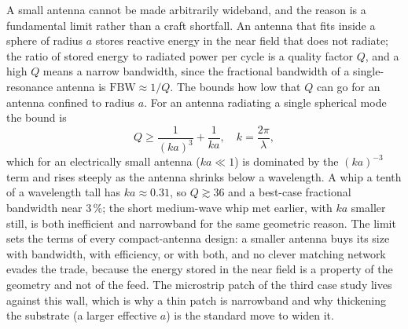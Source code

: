 \begin{mastery}
A small antenna cannot be made arbitrarily wideband, and the reason is a
fundamental limit rather than a craft shortfall. An antenna that fits
inside a sphere of radius $a$ stores reactive energy in the near field
that does not radiate; the ratio of stored energy to radiated power per
cycle is a quality factor $Q$, and a high $Q$ means a narrow bandwidth,
since the fractional bandwidth of a single-resonance antenna is
$\text{FBW}\approx 1/Q$. The  bounds how low that $Q$
can go for an antenna confined to radius $a$. For an antenna radiating a
single spherical mode the bound is
\[
Q \ge \frac{1}{(ka)^{3}} + \frac{1}{ka}, \quad k = \frac{2\pi}{\lambda},
\]
which for an electrically small antenna ($ka\ll 1$) is dominated by the
$(ka)^{-3}$ term and rises steeply as the antenna shrinks below a
wavelength. A whip a tenth of a wavelength tall has $ka\approx 0.31$,
so $Q\gtrsim 36$ and a best-case fractional bandwidth near $3\,\%$; the
short medium-wave whip met earlier, with $ka$ smaller still, is both
inefficient and narrowband for the same geometric reason. The limit
sets the terms of every compact-antenna design: a smaller antenna buys
its size with bandwidth, with efficiency, or with both, and no clever
matching network evades the trade, because the energy stored in the
near field is a property of the geometry and not of the feed. The
microstrip patch of the third case study lives against this wall, which
is why a thin patch is narrowband and why thickening the substrate (a
larger effective $a$) is the standard move to widen it.
\end{mastery}

